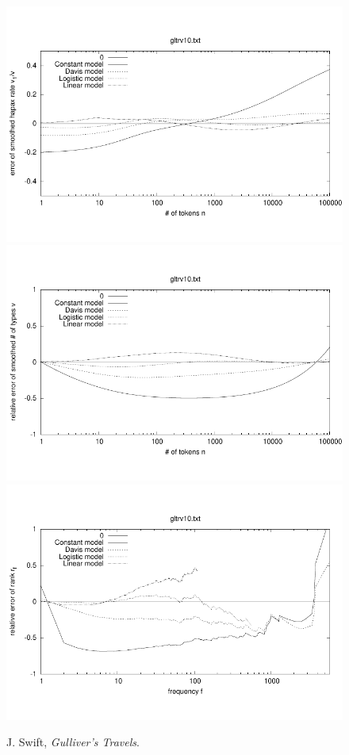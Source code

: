 \documentclass[a4paper,12pt]{article}
\begin{document}
\begin{figure}[p]
  \centering
  \vspace{-2em}
  \includegraphics[width=0.8\columnwidth]{output/herdan/gltrv10_27/token_ratio_residual.pdf}
  \\[-3em]
  \includegraphics[width=0.8\columnwidth]{output/herdan/gltrv10_27/token_residual.pdf}
  \\[-3em]
  \includegraphics[width=0.8\columnwidth]{output/herdan/gltrv10_27/frequency_residual.pdf}
  \vspace{-2em}
  \caption{J. Swift, \emph{Gulliver’s Travels}.\label{figgltrv10R}}
\end{figure}
\end{document}
